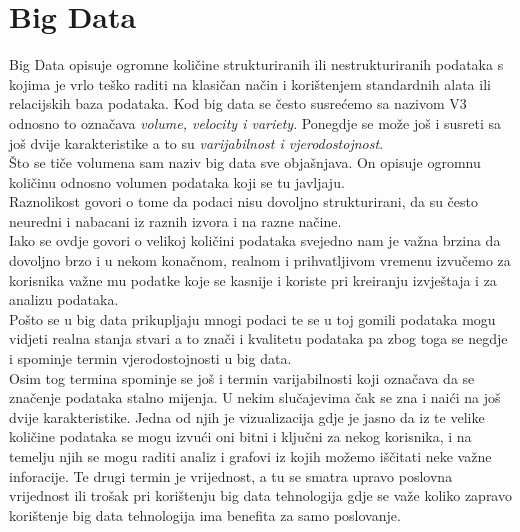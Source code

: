 \documentclass[a4paper,12pt]{foi}
\begin{document}
\chapter{Big Data}
Big Data opisuje ogromne količine strukturiranih ili nestrukturiranih podataka s kojima je vrlo teško raditi na klasičan način i korištenjem standardnih alata ili relacijskih baza podataka. Kod big data se često susrećemo sa nazivom V3 odnosno to označava \textit{volume, velocity i variety}. Ponegdje se može još i susreti sa još dvije karakteristike a to su \textit{varijabilnost i vjerodostojnost}.\\
Što se tiče volumena sam naziv big data sve objašnjava. On opisuje ogromnu količinu odnosno volumen podataka koji se tu javljaju.\\
Raznolikost govori o tome da podaci nisu dovoljno strukturirani, da su često neuredni i nabacani iz raznih izvora i na razne načine.\\
Iako se ovdje govori o velikoj količini podataka svejedno nam je važna brzina da  dovoljno brzo i u nekom konačnom, realnom i prihvatljivom vremenu izvučemo za korisnika važne mu podatke koje se kasnije i koriste pri kreiranju izvještaja i za analizu podataka.\\
Pošto se u big data prikupljaju mnogi podaci te se u toj gomili podataka mogu vidjeti realna stanja stvari a to znači i kvalitetu podataka pa zbog toga se negdje i spominje termin vjerodostojnosti u big data.\\
Osim tog termina spominje se još i termin varijabilnosti koji označava da se značenje podataka stalno mijenja. 
U nekim slučajevima čak se zna i naići na još dvije karakteristike. Jedna od njih je vizualizacija gdje je jasno da iz te velike količine podataka se mogu izvući oni bitni i ključni za nekog korisnika, i na temelju njih se mogu raditi analiz i grafovi iz kojih možemo iščitati neke važne inforacije. Te drugi termin je vrijednost, a tu se smatra upravo poslovna vrijednost ili trošak pri korištenju big data tehnologija gdje se važe koliko zapravo korištenje big data tehnologija ima benefita za samo poslovanje.\citep{WikiBD}
\end{document}
